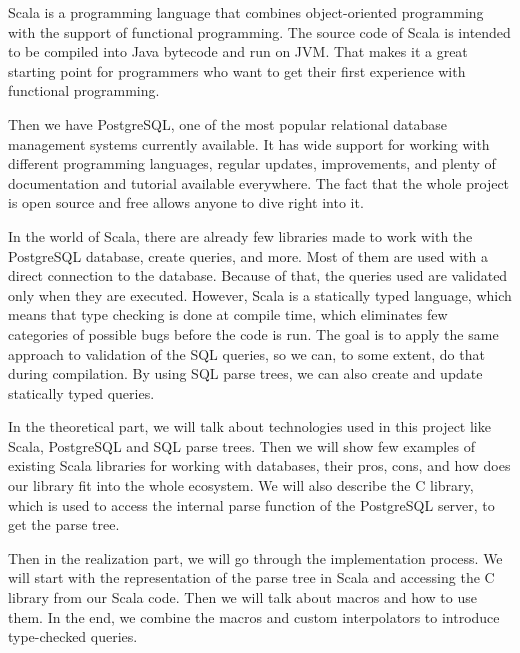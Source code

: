 Scala is a programming language that combines object-oriented programming with the support of functional programming. The source code of Scala is intended to be compiled into Java bytecode and run on JVM. That makes it a great starting point for programmers who want to get their first experience with functional programming. 

Then we have PostgreSQL, one of the most popular relational database management systems currently available. It has wide support for working with different programming languages, regular updates, improvements, and plenty of documentation and tutorial available everywhere. The fact that the whole project is open source and free allows anyone to dive right into it.

In the world of Scala, there are already few libraries made to work with the PostgreSQL database, create queries, and more. Most of them are used with a direct connection to the database. Because of that, the queries used are validated only when they are executed. However, Scala is a statically typed language, which means that type checking is done at compile time, which eliminates few categories of possible bugs before the code is run. The goal is to apply the same approach to validation of the SQL queries, so we can, to some extent, do that during compilation. By using SQL parse trees, we can also create and update statically typed queries.

In the theoretical part, we will talk about technologies used in this project like Scala, PostgreSQL and SQL parse trees. Then we will show few examples of existing Scala libraries for working with databases, their pros, cons, and how does our library fit into the whole ecosystem. We will also describe the C library, which is used to access the internal parse function of the PostgreSQL server, to get the parse tree.

Then in the realization part, we will go through the implementation process. We will start with the representation of the parse tree in Scala and accessing the C library from our Scala code. Then we will talk about macros and how to use them. In the end, we combine the macros and custom interpolators to introduce type-checked queries. 
